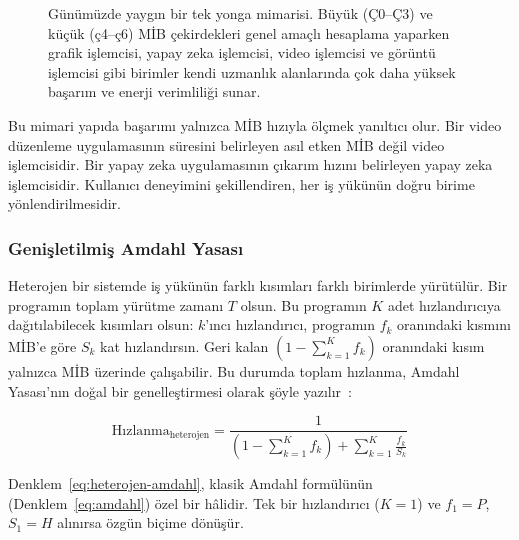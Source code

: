 \begin{figure}[H]
\caption[Günümüz tek yonga blok diyagramı]{Günümüzde yaygın bir tek yonga mimarisi. Büyük (Ç0--Ç3) ve küçük (ç4--ç6) MİB çekirdekleri genel amaçlı hesaplama yaparken grafik işlemcisi, yapay zeka işlemcisi, video işlemcisi ve görüntü işlemcisi gibi birimler kendi uzmanlık alanlarında çok daha yüksek başarım ve enerji verimliliği sunar.}
\label{fig:soc-blok}
\end{figure}

Bu mimari yapıda başarımı yalnızca MİB hızıyla ölçmek yanıltıcı olur. Bir video düzenleme uygulamasının süresini belirleyen asıl etken MİB değil video işlemcisidir. Bir yapay zeka uygulamasının çıkarım hızını belirleyen yapay zeka işlemcisidir. Kullanıcı deneyimini şekillendiren, her iş yükünün doğru birime yönlendirilmesidir.

\subsubsection*{Genişletilmiş Amdahl Yasası}

Heterojen bir sistemde iş yükünün farklı kısımları farklı birimlerde yürütülür. Bir programın toplam yürütme zamanı $T$ olsun. Bu programın $K$ adet hızlandırıcıya dağıtılabilecek kısımları olsun: $k$'ıncı hızlandırıcı, programın $f_k$ oranındaki kısmını MİB'e göre $S_k$ kat hızlandırsın. Geri kalan $(1 - \sum_{k=1}^{K} f_k)$ oranındaki kısım yalnızca MİB üzerinde çalışabilir. Bu durumda toplam hızlanma, Amdahl Yasası'nın doğal bir genelleştirmesi olarak şöyle yazılır~\cite{hill2008}:

\begin{equation}
\text{Hızlanma}_{\text{heterojen}} = \frac{1}{\displaystyle \left(1 - \sum_{k=1}^{K} f_k\right) + \sum_{k=1}^{K} \frac{f_k}{S_k}}
\label{eq:heterojen-amdahl}
\end{equation}

\noindent Denklem~\ref{eq:heterojen-amdahl}, klasik Amdahl formülünün (Denklem~\ref{eq:amdahl}) özel bir hâlidir. Tek bir hızlandırıcı ($K = 1$) ve $f_1 = P$, $S_1 = H$ alınırsa özgün biçime dönüşür.

